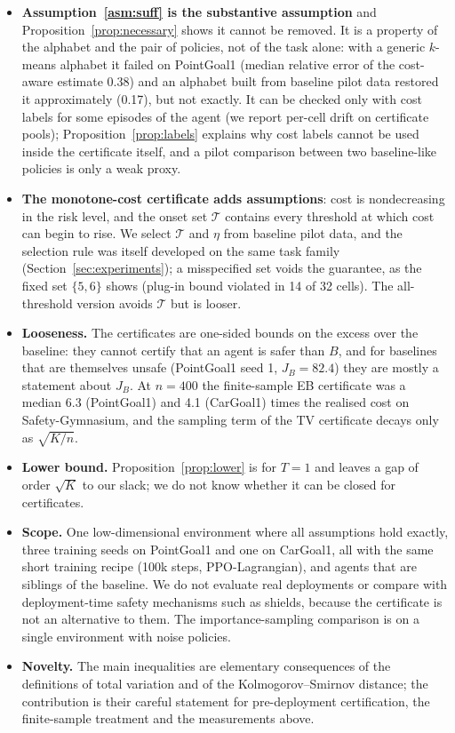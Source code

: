 \documentclass{article}
\begin{document}
\begin{itemize}
  \item \textbf{Assumption~\ref{asm:suff} is the substantive assumption} and Proposition~\ref{prop:necessary} shows it cannot be removed. It is a property of the alphabet and the pair of policies, not of the task alone: with a generic $k$-means alphabet it failed on PointGoal1 (median relative error of the cost-aware estimate 0.38) and an alphabet built from baseline pilot data restored it approximately (0.17), but not exactly. It can be checked only with cost labels for some episodes of the agent (we report per-cell drift on certificate pools); Proposition~\ref{prop:labels} explains why cost labels cannot be used inside the certificate itself, and a pilot comparison between two baseline-like policies is only a weak proxy.
  \item \textbf{The monotone-cost certificate adds assumptions}: cost is nondecreasing in the risk level, and the onset set $\mathcal T$ contains every threshold at which cost can begin to rise. We select $\mathcal T$ and $\eta$ from baseline pilot data, and the selection rule was itself developed on the same task family (Section~\ref{sec:experiments}); a misspecified set voids the guarantee, as the fixed set $\{5,6\}$ shows (plug-in bound violated in 14 of 32 cells). The all-threshold version avoids $\mathcal T$ but is looser.
  \item \textbf{Looseness.} The certificates are one-sided bounds on the excess over the baseline: they cannot certify that an agent is safer than $B$, and for baselines that are themselves unsafe (PointGoal1 seed 1, $J_B=82.4$) they are mostly a statement about $J_B$. At $n=400$ the finite-sample EB certificate was a median 6.3 (PointGoal1) and 4.1 (CarGoal1) times the realised cost on Safety-Gymnasium, and the sampling term of the TV certificate decays only as $\sqrt{K/n}$.
  \item \textbf{Lower bound.} Proposition~\ref{prop:lower} is for $T=1$ and leaves a gap of order $\sqrt K$ to our slack; we do not know whether it can be closed for certificates.
  \item \textbf{Scope.} One low-dimensional environment where all assumptions hold exactly, three training seeds on PointGoal1 and one on CarGoal1, all with the same short training recipe (100k steps, PPO-Lagrangian), and agents that are siblings of the baseline. We do not evaluate real deployments or compare with deployment-time safety mechanisms such as shields, because the certificate is not an alternative to them. The importance-sampling comparison is on a single environment with noise policies.
  \item \textbf{Novelty.} The main inequalities are elementary consequences of the definitions of total variation and of the Kolmogorov--Smirnov distance; the contribution is their careful statement for pre-deployment certification, the finite-sample treatment and the measurements above.
\end{itemize}
\end{document}
